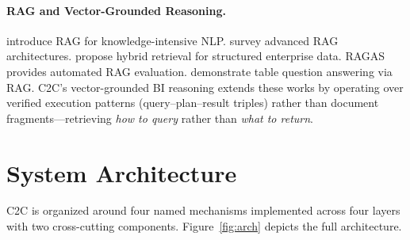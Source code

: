 \documentclass[11pt,a4paper]{article}
\begin{document}
\paragraph{RAG and Vector-Grounded Reasoning.}
\citet{lewis2020rag} introduce RAG for knowledge-intensive NLP.
\citet{gao2024rag} survey advanced RAG architectures.  \citet{cheerla2025rag}
propose hybrid retrieval for structured enterprise data.  RAGAS
\citep{es2023ragas} provides automated RAG evaluation.
\citet{pan2022tableqa} demonstrate table question answering via RAG.
C2C's vector-grounded BI reasoning extends these works by operating over verified
execution patterns (query--plan--result triples) rather than document
fragments---retrieving \emph{how to query} rather than \emph{what to return}.

\section{System Architecture}\label{sec:arch}

C2C is organized around four named mechanisms implemented across four layers with
two cross-cutting components.  Figure~\ref{fig:arch} depicts the full architecture.
\end{document}
